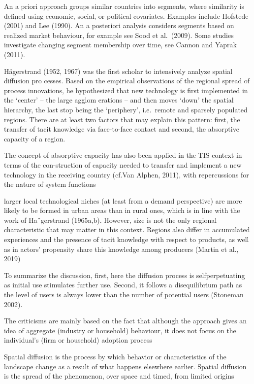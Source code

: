 \documentclass[
  authoryear,
  preprint,
  3p]{elsarticle}
\begin{document}
An a priori approach groups similar countries into segments, where
similarity is defined using economic, social, or political covariates.
Examples include Hofstede (2001) and Lee (1990). An a posteriori
analysis considers segments based on realized market behaviour, for
example see Sood et al.~(2009). Some studies investigate changing
segment membership over time, see Cannon and Yaprak (2011).

\citet{fritsch2015new} Hägerstrand (1952, 1967) was the first scholar to
intensively analyze spatial diffusion pro cesses. Based on the empirical
observations of the regional spread of process innovations, he
hypothesized that new technology is first implemented in the `center' --
the large agglom erations -- and then moves `down' the spatial
hierarchy, the last stop being the `periphery', i.e.~remote and sparsely
populated regions. There are at least two factors that may explain this
pattern: first, the transfer of tacit knowledge via face-to-face contact
and second, the absorptive capacity of a region.

\citet{bento2015spatial} The concept of absorptive capacity has also
been applied in the TIS context in terms of the con-struction of
capacity needed to transfer and implement a new technology in the
receiving country (cf.Van Alphen, 2011), with repercussions for the
nature of system functions

\citet{bednarz2020pulled} larger local technological niches (at least
from a demand perspective) are more likely to be formed in urban areas
than in rural ones, which is in line with the work of Ha¨gerstrand
(1965a,b). However, size is not the only regional characteristic that
may matter in this context. Regions also differ in accumulated
experiences and the presence of tacit knowledge with respect to
products, as well as in actors' propensity share this knowledge among
producers (Martin et al., 2019)

To summarize the discussion, first, here the diffusion process is
selfperpetuating as initial use stimulates further use. Second, it
follows a disequilibrium path as the level of users is always lower than
the number of potential users (Stoneman 2002).

The criticisms are mainly based on the fact that although the approach
gives an idea of aggregate (industry or household) behaviour, it does
not focus on the individual's (firm or household) adoption process

\citet{morrill2020spatial} Spatial diffusion is the process by which
behavior or characteristics of the landscape change as a result of what
happens elsewhere earlier. Spatial diffusion is the spread of the
phenomenon, over space and timed, from limited origins
\end{document}

